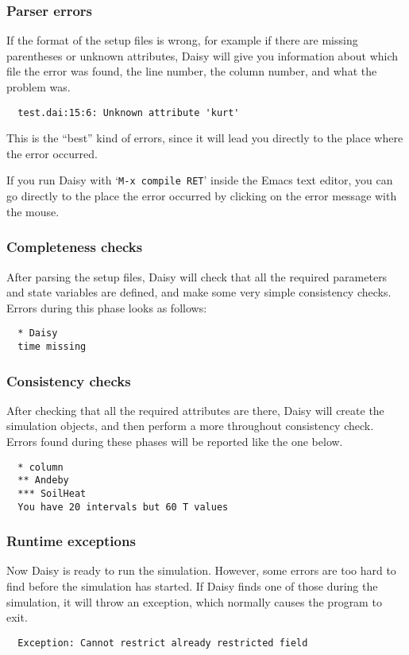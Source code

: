 \subsubsection{Parser errors}

If the format of the setup files is wrong, for example if there are
missing parentheses or unknown attributes, Daisy will give you
information about which file the error was found, the line number, the
column number, and what the problem was.
\begin{verbatim}
  test.dai:15:6: Unknown attribute 'kurt'
\end{verbatim}
This is the ``best'' kind of errors, since it will lead you directly
to the place where the error occurred.  

If you run Daisy with `\texttt{M-x~compile~RET}' inside the Emacs
text editor, you can go directly to the place the error occurred by
clicking on the error message with the mouse.

\subsubsection{Completeness checks}

After parsing the setup files, Daisy will check that all the required
parameters and state variables are defined, and make some very simple
consistency checks.  Errors during this phase looks as follows:
\begin{verbatim}
  * Daisy
  time missing
\end{verbatim}

\subsubsection{Consistency checks}

After checking that all the required attributes are there, Daisy will
create the simulation objects, and then perform a more throughout
consistency check.  Errors found during these phases will be reported
like the one below.
\begin{verbatim}
  * column
  ** Andeby
  *** SoilHeat
  You have 20 intervals but 60 T values
\end{verbatim}

\subsubsection{Runtime exceptions}

Now Daisy is ready to run the simulation.  However, some errors are
too hard to find before the simulation has started.  If Daisy finds
one of those during the simulation, it will throw an exception, which
normally causes the program to exit.  
\begin{verbatim}
  Exception: Cannot restrict already restricted field
\end{verbatim}

